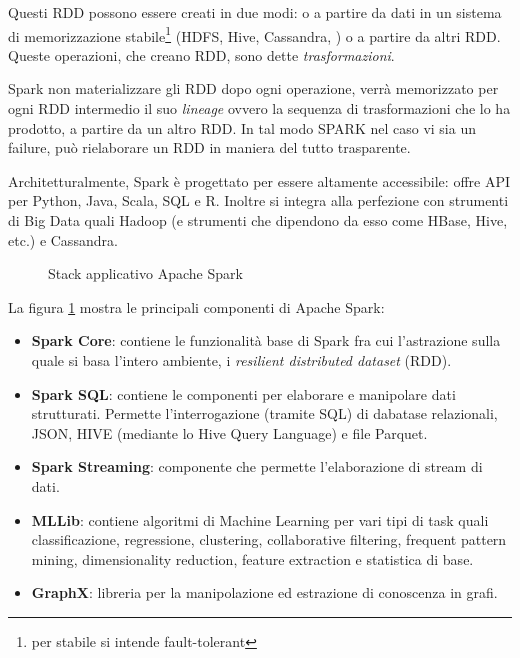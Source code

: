 Questi RDD possono essere creati in due modi: o a partire da dati in un sistema di memorizzazione stabile\footnote{per stabile si intende fault-tolerant} (HDFS, Hive, Cassandra, ) o a partire da altri RDD. Queste operazioni, che creano RDD, sono dette \emph{trasformazioni}.

Spark non materializzare gli RDD dopo ogni operazione, verrà memorizzato per ogni RDD intermedio il suo \emph{lineage} ovvero la sequenza di trasformazioni che lo ha prodotto, a partire da un altro RDD. In tal modo SPARK nel caso vi sia un failure, può rielaborare un RDD in maniera del tutto trasparente.
 
Architetturalmente, Spark è progettato per essere altamente accessibile: offre API per Python, Java, Scala, SQL e R. Inoltre si integra alla perfezione con strumenti di Big Data quali Hadoop (e strumenti che dipendono da esso come HBase, Hive, etc.) e Cassandra.




 
\begin{figure}[htbp]
    \caption{Stack applicativo Apache Spark}
    \label{fig:sparkstack}
\end{figure}




La figura \ref{fig:sparkstack} mostra le principali componenti di Apache Spark:
\begin{itemize}
\item \textbf{Spark Core}: contiene le funzionalità base di Spark fra cui l'astrazione sulla quale si basa l'intero ambiente, i \textit{resilient distributed dataset} (RDD).
\item \textbf{Spark SQL}: contiene le componenti per elaborare e manipolare dati strutturati. Permette l'interrogazione (tramite SQL) di dabatase relazionali, JSON, HIVE (mediante lo Hive Query Language) e file Parquet. 
\item \textbf{Spark Streaming}: componente che permette l'elaborazione di stream di dati.
\item \textbf{MLLib}: contiene algoritmi di Machine Learning per vari tipi di task quali classificazione, regressione, clustering, collaborative filtering, frequent pattern mining, dimensionality reduction, feature extraction e statistica di base.
\item \textbf{GraphX}: libreria per la manipolazione ed estrazione di conoscenza in grafi.
\end{itemize}

